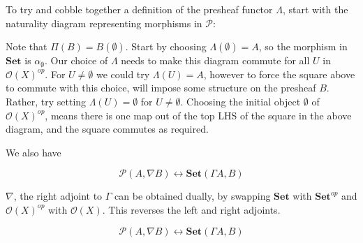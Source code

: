 \documentclass{article}
\begin{document}
To try and cobble together a definition of the presheaf functor $\Lambda$, start with the naturality diagram representing morphisms in $\mathcal{P}$:

\begin{center}
\end{center}

Note that $\Pi (B) = B(\emptyset)$. Start by choosing $\Lambda(\emptyset) = A$, so the morphism in $\mathbf{Set}$ is $\alpha_\emptyset$. Our choice of $\Lambda$ needs to make this diagram commute for all $U$ in $\mathcal{O}(X)^{op}$. For $U \neq \emptyset$ we could try $\Lambda(U) = A$, however to force the square above to commute with this choice, will impose some structure on the presheaf $B$. Rather, try setting  $\Lambda(U) = \emptyset$ for $U \neq \emptyset$. Choosing the initial object $\emptyset$ of $\mathcal{O}(X)^{op}$, means there is one map out of the top LHS of the square in the above diagram, and the square commutes as required.

We also have

\begin{equation*}
  \mathcal{P}(A, \nabla B) \leftrightarrow \mathbf{Set}(\Gamma A, B)
\end{equation*}

$\nabla$, the right adjoint to $\Gamma$ can be obtained dually, by swapping $\mathbf{Set}$ with $\mathbf{Set}^{op}$ and $\mathcal{O}(X)^{op}$ with $\mathcal{O}(X)$. This reverses the left and right adjoints.

\begin{equation*}
  \mathcal{P}(A, \nabla B) \leftrightarrow \mathbf{Set}(\Gamma A, B)
\end{equation*}
\end{document}
